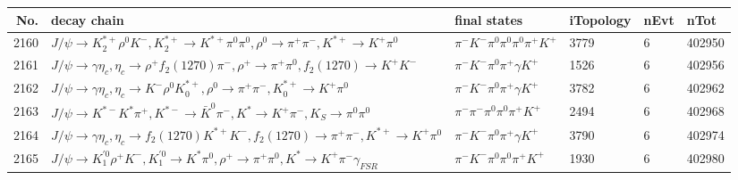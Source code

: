 \begin{table}[htbp] 
\begin{center}
\begin{small}
\begin{tabular}{rlllll}\hline\hline
 No. & decay chain & final states &  iTopology & nEvt & nTot \\\hline
2160&$J/\psi       \rightarrow K_2^{*+}       \rho^{0}      K^{-}          , K_2^{*+}        \rightarrow K^{*+}         \pi^{0}        \pi^{0}        , \rho^{0}       \rightarrow \pi^{+}        \pi^{-}        , K^{*+}          \rightarrow K^{+}          \pi^{0}        $&$\pi^{-}        K^{-}          \pi^{0}        \pi^{0}        \pi^{0}        \pi^{+}        K^{+}          $& 3779&    6&402950\\
2161&$J/\psi       \rightarrow \gamma       \eta_{c}    , \eta_{c}     \rightarrow \rho^{+}      f_{2}(1270)    \pi^{-}        , \rho^{+}       \rightarrow \pi^{+}        \pi^{0}        , f_{2}(1270)     \rightarrow K^{+}          K^{-}          $&$\pi^{-}        K^{-}          \pi^{0}        \pi^{+}        \gamma       K^{+}          $& 1526&    6&402956\\
2162&$J/\psi       \rightarrow \gamma       \eta_{c}    , \eta_{c}     \rightarrow K^{-}          \rho^{0}      K_{0}^{*+}     , \rho^{0}       \rightarrow \pi^{+}        \pi^{-}        , K_{0}^{*+}      \rightarrow K^{+}          \pi^{0}        $&$\pi^{-}        K^{-}          \pi^{0}        \pi^{+}        \gamma       K^{+}          $& 3782&    6&402962\\
2163&$J/\psi       \rightarrow K^{*-}         K^{*}          \pi^{+}        , K^{*-}          \rightarrow \bar{K}^{0}   \pi^{-}        , K^{*}           \rightarrow K^{+}          \pi^{-}        , K_{S}           \rightarrow \pi^{0}        \pi^{0}        $&$\pi^{-}        \pi^{-}        \pi^{0}        \pi^{0}        \pi^{+}        K^{+}          $& 2494&    6&402968\\
2164&$J/\psi       \rightarrow \gamma       \eta_{c}    , \eta_{c}     \rightarrow f_{2}(1270)    K^{*+}         K^{-}          , f_{2}(1270)     \rightarrow \pi^{+}        \pi^{-}        , K^{*+}          \rightarrow K^{+}          \pi^{0}        $&$\pi^{-}        K^{-}          \pi^{0}        \pi^{+}        \gamma       K^{+}          $& 3790&    6&402974\\
2165&$J/\psi       \rightarrow K_1^{'0}      \rho^{+}      K^{-}          , K_1^{'0}       \rightarrow K^{*}          \pi^{0}        , \rho^{+}       \rightarrow \pi^{+}        \pi^{0}        , K^{*}           \rightarrow K^{+}          \pi^{-}        \gamma_{FSR} $&$\pi^{-}        K^{-}          \pi^{0}        \pi^{0}        \pi^{+}        K^{+}          $& 1930&    6&402980\\

\end{tabular}
\end{small}
\end{center}
\end{table}
